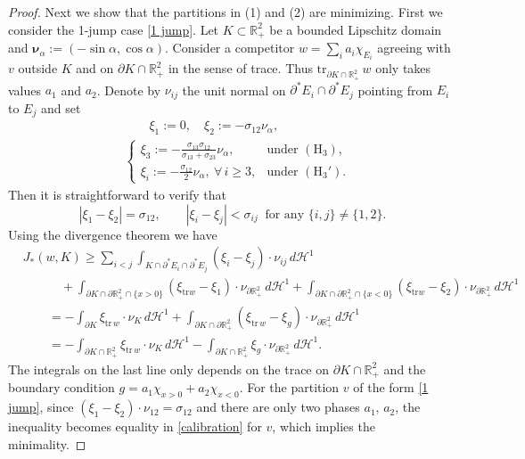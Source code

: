 \documentclass[leqno,11pt]{amsart}
\let\pa=\partial
\let\al=\alpha
\let\f=\frac
\let\pa=\partial
\theoremstyle{remark}
\newcommand{\BR}{\mathbb{R}}
\newcommand{\ch}{\mathcal{H}^1}
\begin{document}
\begin{proof}
Next we show that the partitions in (1) and (2) are minimizing. First we consider the 1-jump case \eqref{1 jump}. Let $K\subset \BR_+^2$ be a bounded Lipschitz domain and $\mathbf{\nu}_\al:=(-\sin\alpha,\cos\alpha)$. Consider a competitor $w=\sum_i a_i\chi_{E_i}$ agreeing with $v$ outside $K$ and on $\pa K\cap \BR_+^2$ in the sense of trace. Thus $\mathrm{tr}_{\pa K\cap\BR_+^2} \,w$ only takes values $a_1$ and $a_2$.  Denote by $\nu_{ij}$ the unit normal on $\pa^*E_i\cap\pa^*E_j$ pointing from $E_i$ to $E_j$ and set
\begin{align*}
  &\qquad\xi_1:=0,\quad \xi_2:= -\sigma_{12}\nu_\alpha,\\
  & \begin{cases}
      \xi_3:= -\f{\sigma_{13}\sigma_{12}}{\sigma_{13}+\sigma_{23}}\nu_\alpha, & \text{under }(\mathrm{H}_3),\\
      \xi_i:= -\f{\sigma_{12}}{2}\nu_\al,\ \forall\,i\geq 3, & \text{under }(\mathrm{H}_3').
  \end{cases}
\end{align*}
Then it is straightforward to verify that 
\begin{equation*}
    |\xi_1-\xi_2|=\sigma_{12},  \qquad |\xi_i-\xi_j|<\sigma_{ij}\ \text{ for any }\{i,j\} \neq \{1,2\}.
\end{equation*}
Using the divergence theorem we have 
\begin{equation}\label{calibration}
\begin{split}
    &J_*(w,K)\geq \sum_{i<j} \int_{K\cap \pa^*E_i\cap\pa^*E_j} (\xi_i-\xi_j)\cdot \nu_{ij}\,d\ch\\
    &\qquad\quad+\int_{\pa K\cap \pa \BR_+^2\cap\{x>0\}} (\xi_{\mathrm{tr} w}-\xi_1)\cdot\nu_{\pa \BR_+^2}\,d\ch +\int_{\pa K\cap \pa \BR_+^2\cap\{x<0\}} (\xi_{\mathrm{tr} w}-\xi_2)\cdot\nu_{\pa \BR_+^2}\,d\ch \\
    &\qquad= -\int_{\pa K} \xi_{\mathrm{tr}\,w}\cdot \nu_K \,d\ch+\int_{\pa K\cap\pa\BR_+^2}(\xi_{\mathrm{tr}\,w}-\xi_g)\cdot \nu_{\pa \BR_+^2}\,d\ch\\
    &\qquad=-\int_{\pa K\cap \BR_+^2}\xi_{\mathrm{tr}\,w}\cdot \nu_K \,d\ch-\int_{\pa K\cap \BR_+^2} \xi_g\cdot \nu_{\pa \BR_+^2}\,d\ch.
    \end{split}
\end{equation}
The integrals on the last line only depends on the trace on $\pa K\cap \BR_+^2$ and the boundary condition $g=a_1\chi_{x>0}+a_2\chi_{x<0}$. For the partition $v$ of the form \eqref{1 jump}, since $(\xi_1-\xi_2)\cdot \nu_{12}=\sigma_{12}$ and there are only two phases $a_1,\,a_2$, the inequality becomes equality in \eqref{calibration} for $v$, which implies the minimality.


\end{proof}
\end{document}
